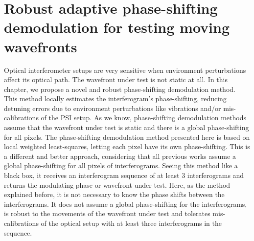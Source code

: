 \chapter{Robust adaptive phase-shifting demodulation for testing moving 
wavefronts}

Optical interferometer setups are very sensitive when environment
perturbations affect its optical path. The wavefront under test is not
static at all. In this chapter, we propose a novel and robust phase-shifting
demodulation method. This method locally estimates the interferogram's
phase-shifting, reducing detuning errors due to environment perturbations
like vibrations and/or mis-calibrations of the PSI setup. 
As we know, phase-shifting demodulation methods assume that the
wavefront under test is static and there is a global phase-shifting for all
pixels. The phase-shifting demodulation method presented here is based on
local weighted least-squares, letting each pixel have its own phase-shifting.
This is a different and better approach, considering that all previous works
assume a global phase-shifting for all pixels of interferograms. Seeing this
method like a black box, it receives an interferogram sequence of at least 3
interferograms and returns the modulating phase or wavefront under test.
Here, as the method explained before, it is not necessary to know the phase 
shifts between the interferograms.
It does not assume a global phase-shifting for the interferograms, is robust
to the movements of the wavefront under test and tolerates
mis-calibrations of the optical setup with at least three
interferograms in the sequence.

